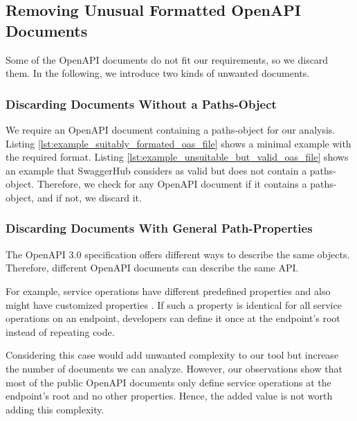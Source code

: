 \subsection{Removing Unusual Formatted OpenAPI Documents}
\label{sec:cleaning_data:remove_unusual_formated_data}

Some of the OpenAPI documents do not fit our requirements, so we discard them. In the following, we introduce two kinds of unwanted documents. 

\subsubsection{Discarding Documents Without a Paths-Object}
We require an OpenAPI document containing a paths-object for our analysis. Listing \ref{lst:example_suitably_formated_oas_file} shows a minimal example with the required format. Listing \ref{lst:example_unsuitable_but_valid_oas_file} shows an example that SwaggerHub considers as valid but does not contain a paths-object. Therefore, we check for any OpenAPI document if it contains a paths-object, and if not, we discard it.



\subsubsection{Discarding Documents With General Path-Properties}


The OpenAPI 3.0 specification offers different ways to describe the same objects. Therefore, different OpenAPI documents can describe the same API. 

For example, service operations have different predefined properties \cite{OpenAPI_spec_operation_Object} and also might have customized properties \cite{OpenAPI_spec_specification_extentions}. If such a property is identical for all service operations on an endpoint, developers can define it once at the endpoint's root \cite{OpenAPI_spec_path_item_Object} instead of repeating code.

Considering this case would add unwanted complexity to our tool but increase the number of documents we can analyze.
However, our observations show that most of the public OpenAPI documents only define service operations at the endpoint's root and no other properties. Hence, the added value is not worth adding this complexity. 
